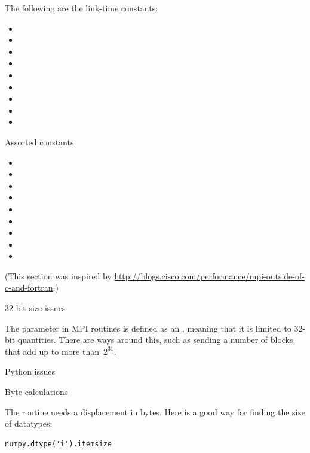 The following are the link-time constants:
\begin{itemize}
\item {}
\item {}
\item {}
\item {}
\item {}
\item {}
\item {}
\item {}
\item {}
\end{itemize}

Assorted constants:
\begin{itemize}
\item {}
\item {}
\item {}
\item {}
\item {}
\item {}
\item {}
\item {}
\item {}
\end{itemize}

(This section was inspired by
\url{http://blogs.cisco.com/performance/mpi-outside-of-c-and-fortran}.)


 {32-bit size issues}

The  parameter in MPI routines is defined as an ,
meaning that it is limited to 32-bit quantities.  There are ways
around this, such as sending a number of
 blocks that add up to more than~$2^{31}$.

 {Python issues}
\label{sec:python-stuff}

 {Byte calculations}

The  routine needs a displacement in
bytes. Here is a good way for finding the size of  datatypes:
\lstset{language=Python} %
\begin{lstlisting}
numpy.dtype('i').itemsize
\end{lstlisting}

